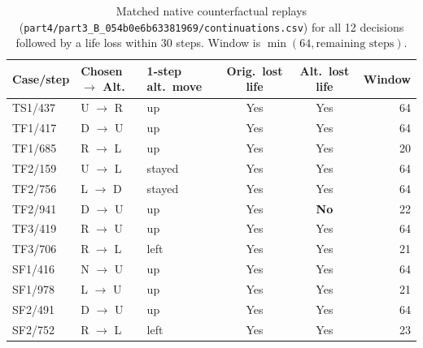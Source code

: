 \begin{table}[H]\centering\small
\begin{tabular}{@{}lllccr@{}}\toprule
Case/step & Chosen $\to$ Alt. & 1-step alt.\ move & Orig.\ lost life & Alt.\ lost life & Window\\\midrule
TS1/437 & U $\to$ R & up & Yes & Yes & 64\\
TF1/417 & D $\to$ U & up & Yes & Yes & 64\\
TF1/685 & R $\to$ L & up & Yes & Yes & 20\\
TF2/159 & U $\to$ L & stayed & Yes & Yes & 64\\
TF2/756 & L $\to$ D & stayed & Yes & Yes & 64\\
TF2/941 & D $\to$ U & up & Yes & \textbf{No} & 22\\
TF3/419 & R $\to$ U & up & Yes & Yes & 64\\
TF3/706 & R $\to$ L & left & Yes & Yes & 21\\
SF1/416 & N $\to$ U & up & Yes & Yes & 64\\
SF1/978 & L $\to$ U & up & Yes & Yes & 21\\
SF2/491 & D $\to$ U & up & Yes & Yes & 64\\
SF2/752 & R $\to$ L & left & Yes & Yes & 23\\\bottomrule
\end{tabular}
\caption{Matched native counterfactual replays (\texttt{part4/part3\_B\_054b0e6b63381969/continuations.csv}) for all 12 decisions followed by a life loss within 30 steps. Window is $\min(64,\text{remaining steps})$.}
\label{tab:continuations}
\end{table}
